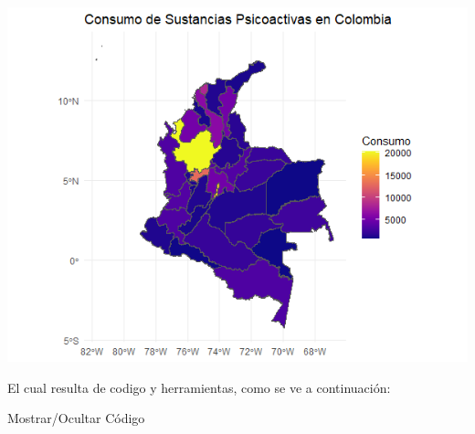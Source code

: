 \documentclass[
]{article}
\begin{document}
\includegraphics{images/Mapa de calor.png}

El cual resulta de codigo y herramientas, como se ve a continuación:

Mostrar/Ocultar Código
\end{document}
